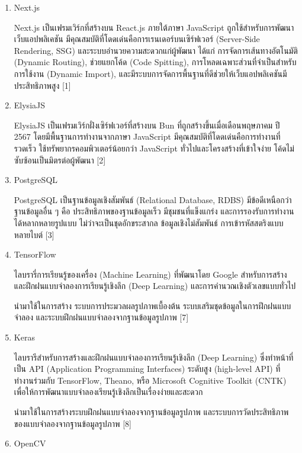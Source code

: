 \documentclass[12pt,oneside,openright,a4paper]{cpe-thai-project}
\begin{document}
\begin{enumerate}
\item Next.js

	\hspace{2em} Next.js เป็นเฟรมเวิร์กที่สร้างบน React.js ภายใต้ภาษา JavaScript ถูกใช้สำหรับการพัฒนาเว็บแอปพลิเคชัน มีคุณสมบัติที่โดดเด่นคือการเรนเดอร์บนเซิร์ฟเวอร์ (Server-Side Rendering, SSG) และระบบอำนวยความสะดวกแก่ผู้พัฒนา ได้แก่ การจัดการเส้นทางอัตโนมัติ (Dynamic Routing), ช่วยแยกโค้ด (Code Spitting), การโหลดเฉพาะส่วนที่จำเป็นสำหรับการใช้งาน (Dynamic Import), และมีระบบการจัดการพื้นฐานที่ดีช่วยให้เว็บแอปพลิเคชันมีประสิทธิภาพสูง [1]
\item ElysiaJS

	\hspace{2em} ElysiaJS เป็นเฟรมเวิร์กฝั่งเซิร์ฟเวอร์ที่สร้างบน Bun ที่ถูกสร้างขึ้นเมื่อเดือนพฤษภาคม ปี 2567 โดยมีพื้นฐานการทำงานจากภาษา JavaScript มีคุณสมบัติที่โดดเด่นคือการทำงานที่รวดเร็ว ใช้ทรัพยากรคอมพิวเตอร์น้อยกว่า JavaScript ทั่วไปและโครงสร้างที่เข้าใจง่าย โค้ดไม่ซับซ้อนเป็นมิตรต่อผู้พัฒนา [2]
\item PostgreSQL

	\hspace{2em} PostgreSQL เป็นฐานข้อมูลเชิงสัมพันธ์ (Relational Database, RDBS) มีข้อดีเหนือกว่าฐานข้อมูลอื่น ๆ คือ ประสิทธิภาพของฐานข้อมูลเร็ว มีชุมชนที่แข็งแกร่ง และการรองรับการทำงานได้หลากหลายรูปแบบ ไม่ว่าจะเป็นชุดอักขระสากล ข้อมูลเชิงไม่สัมพันธ์ การเข้ารหัสสตริงแบบหลายไบต์ [3]
\item TensorFlow
	
	\hspace{2em} ไลบรารี่การเรียนรู้ของเครื่อง (Machine Learning) ที่พัฒนาโดย Google สำหรับการสร้างและฝึกฝนแบบจำลองการเรียนรู้เชิงลึก (Deep Learning) และการคำนวณเชิงตัวเลขแบบทั่วไป 

	\hspace{2em} นำมาใช้ในการสร้าง ระบบการประมวลผลรูปภาพเบื้องต้น ระบบเสริมชุดข้อมูลในการฝึกฝนแบบจำลอง และระบบฝึกฝนแบบจำลองจากฐานข้อมูลรูปภาพ [7]
\item Keras

	\hspace{2em} ไลบรารีสำหรับการสร้างและฝึกฝนแบบจำลองการเรียนรู้เชิงลึก (Deep Learning) ซึ่งทำหน้าที่เป็น API (Application Programming Interfaces) ระดับสูง (high-level API) ที่ทำงานร่วมกับ TensorFlow, Theano, หรือ Microsoft Cognitive Toolkit (CNTK) เพื่อให้การพัฒนาแบบจำลองเรียนรู้เชิงลึกเป็นเรื่องง่ายและสะดวก

	\hspace{2em} นำมาใช้ในการสร้างระบบฝึกฝนแบบจำลองจากฐานข้อมูลรูปภาพ และระบบการวัดประสิทธิภาพของแบบจำลองจากฐานข้อมูลรูปภาพ [8]
\item OpenCV


\end{enumerate}
\end{document}
